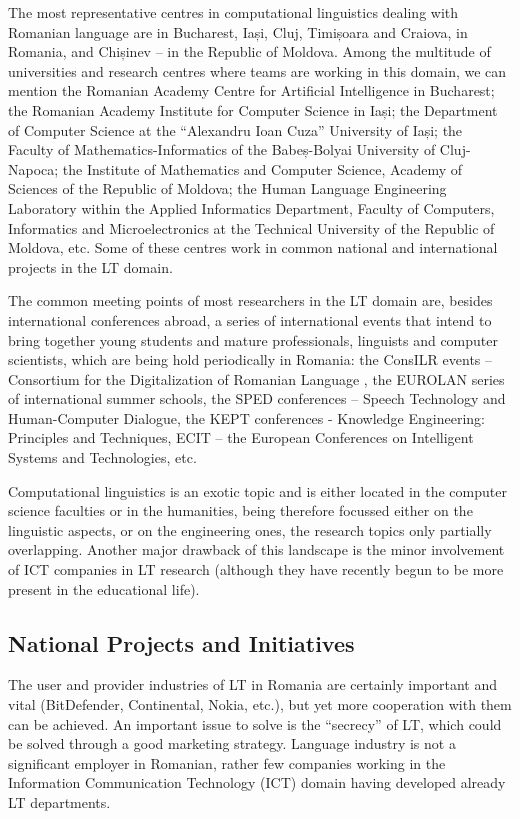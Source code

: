 \documentclass[]{../../metanetpaper}
\begin{document}
\begin{multicols}{2}
The most representative centres in computational linguistics dealing with Romanian language are in Bucharest, Iași, Cluj, Timișoara and Craiova, in Romania, and Chișinev – in the Republic of Moldova. Among the multitude of universities and research centres where teams are working in this domain, we can mention the Romanian Academy Centre for Artificial Intelligence in Bucharest; the Romanian Academy Institute for Computer Science in Iași; the Department of Computer Science at the “Alexandru Ioan Cuza” University of Iași; the Faculty of Mathematics-Informatics of the Babeș-Bolyai University of Cluj-Napoca; the Institute of Mathematics and Computer Science, Academy of Sciences of the Republic of Moldova; the Human Language Engineering Laboratory within the Applied Informatics Department, Faculty of Computers, Informatics and Microelectronics at the Technical University of the Republic of Moldova, etc. Some of these centres work in common national and international projects in the LT domain. 

The common meeting points of most researchers in the LT domain are, besides international conferences abroad, a series of international events that intend to bring together young students and mature professionals, linguists and computer scientists, which are being hold periodically in Romania: the ConsILR events – Consortium for the Digitalization of Romanian Language \cite{consilr}, the EUROLAN series of international summer schools, the SPED conferences – Speech Technology and Human-Computer Dialogue, the KEPT conferences - Knowledge Engineering: Principles and Techniques, ECIT – the European Conferences on Intelligent Systems and Technologies, etc.

Computational linguistics is an exotic topic and is either located in the computer science faculties or in the humanities, being therefore focussed either on the linguistic aspects, or on the engineering ones, the research topics only partially overlapping. Another major drawback of this landscape is the minor involvement of ICT companies in LT research (although they have recently begun to be more present in the educational life).

\subsection{National Projects and Initiatives}

The user and provider industries of LT in Romania are certainly important and vital (BitDefender, Continental, Nokia, etc.), but yet more cooperation with them can be achieved. An important issue to solve is the “secrecy” of LT, which could be solved through a good marketing strategy. Language industry is not a significant employer in Romanian, rather few companies working in the Information Communication Technology (ICT) domain having developed already LT departments.


\end{multicols}
\end{document}
